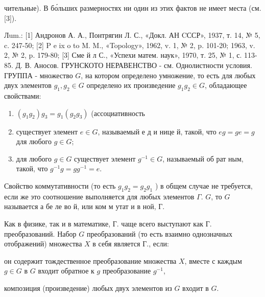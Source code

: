 \documentclass[10pt]{article}
\begin{document}
чительные). В бо́льших размерностях ни один из этих фактов не имеет места (см. [3]).



Лum.: [1] Андронов А. А., Понтрягин Л. С., «Докл. АН CССР», 1937, т. 14, № 5, c. 247-50; [2] P e ix o to M. M., «Topology», 1962, v. 1, № 2, p. 101-20; 1963, v. 2, № 2, p. 179-80; [3] Сме й л С., «Успехи матем. наук», 1970, т. 25, № 1, с. 113-85. Д. В. Аносов. ГРУНСКОТО НЕРАВЕНСТВО - см. Однолистности условия. ГРУППА - множество $G$, на котором определено умножение, то есть для любых двух элементов $g_{1}, g_{2} \in G$ определено их произведение $g_{1} g_{2} \in G$, обладающее свойствами:



\begin{enumerate}

  \item $\left(g_{1} g_{2}\right) g_{3}=g_{1}\left(g_{2} g_{3}\right)$ (ассоциативность



  \item существует элемент $e \in G$, называемый е д и нице й, такой, что $e g=g e=g$ для любого $g \in G$;



  \item для любого $g \in G$ существует элемент $g^{-1} \in G$, называемый об рат ным, такой, что $g^{-1} g=g g^{-1}=e$.



\end{enumerate}



Свойство коммутативности (то есть $g_{1} g_{2}=g_{2} g_{1}$ ) в общем случае не требуется, если же это соотношение выполняется для любых элементов $\Gamma$. $G$, то $G$ называется а бе ле во й, или ком м утат и в ной, Г.



Как в физике, так и в математике, Г. чаще всего выступают как Г. преобразований. Набор $G$ преобразований (то есть взаимно однозначных отображений) множества $X$ в себя является Г., если:



он содержит тождественное преобразование множества $X$, вместе с каждым $g \in G$ в $G$ входит обратное к $g$ преобразование $g^{-1}$,



композиция (произведение) любых двух элементов из $G$ входит в $G$.
\end{document}
